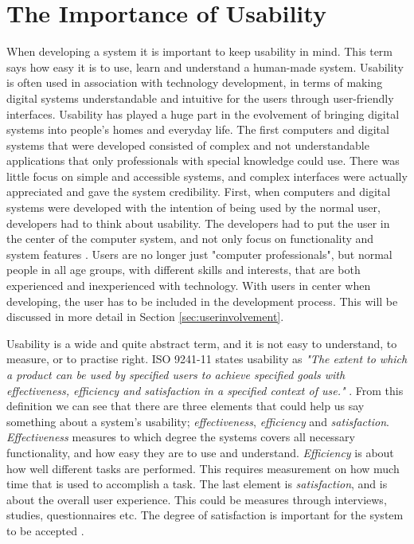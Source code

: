 \section{The Importance of Usability}
\label{sec:usability}
When developing a system it is important to keep usability in mind. This term says how easy it is to use, learn and understand a human-made system. Usability is often used in association with technology development, in terms of making digital systems understandable and intuitive for the users through user-friendly interfaces. Usability has played a huge part in the evolvement of bringing digital systems into people's homes and everyday life. The first computers and digital systems that were developed consisted of complex and not understandable applications that only professionals with special knowledge could use. There was little focus on simple and accessible systems, and complex interfaces were actually appreciated and gave the system credibility. First, when computers and digital systems were developed with the intention of being used by the normal user, developers had to think about usability. The developers had to put the user in the center of the computer system, and not only focus on functionality and system features \cite{mmi}. Users are no longer just "computer professionals", but normal people in all age groups, with different skills and interests, that are both experienced and inexperienced with technology. With users in center when developing, the user has to be included in the development process. This will be discussed in more detail in Section \ref{sec:userinvolvement}.  

Usability is a wide and quite abstract term, and it is not easy to understand, to measure, or to practise right. ISO 9241-11 states usability as \emph{"The extent to which a product can be used by specified users to achieve specified goals with effectiveness, efficiency and satisfaction in a specified context of use."} \cite{jokela2003standard}. From this definition we can see that there are three elements that could help us say something about a system's usability; \emph{effectiveness}, \emph{efficiency} and \emph{satisfaction}. \emph{Effectiveness} measures to which degree the systems covers all necessary functionality, and how easy they are to use and understand. \emph{Efficiency} is about how well different tasks are performed. This requires measurement on how much time that is used to accomplish a task. The last element is \emph{satisfaction}, and is about the overall user experience. This could be measures through interviews, studies, questionnaires etc. The degree of satisfaction is important for the system to be accepted \cite{mmi}. 

